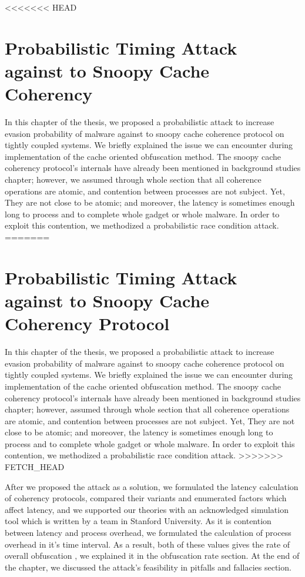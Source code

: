<<<<<<< HEAD
\chapter{Probabilistic Timing Attack against to Snoopy Cache Coherency}
In this chapter of the thesis, we proposed a probabilistic attack to increase evasion probability of malware against to snoopy cache coherence protocol on tightly coupled systems. We briefly explained the issue we can encounter during implementation of the cache oriented obfuscation method. The snoopy cache coherency protocol's internals have already been mentioned in background studies chapter; however, we assumed through whole section that all coherence operations are atomic, and contention between processes are not subject. Yet, They are not close to be atomic; and moreover, the latency is sometimes enough long to process and to complete whole gadget or whole malware. In order to exploit this contention, we methodized a probabilistic race condition attack. 
=======
\chapter{Probabilistic Timing Attack against to Snoopy Cache Coherency Protocol}
In this chapter of the thesis, we proposed a probabilistic attack to increase evasion probability of malware against to snoopy cache coherence protocol on tightly coupled systems. We briefly explained the issue we can encounter during implementation of the cache oriented obfuscation method. The snoopy cache coherency protocol's internals have already been mentioned in background studies chapter; however, assumed through whole section that all coherence operations are atomic, and contention between processes are not subject. Yet, They are not close to be atomic; and moreover, the latency is sometimes enough long to process and to complete whole gadget or whole malware. In order to exploit this contention, we methodized a probabilistic race condition attack. 
>>>>>>> FETCH_HEAD

After we proposed the attack as a solution, we formulated the latency calculation of coherency protocols, compared their variants and enumerated factors which affect latency, and we supported our theories with an acknowledged simulation tool which is written by a team in Stanford University. As it is contention between latency and process overhead, we formulated the calculation of process overhead in it's time interval. As a result, both of these values gives the rate of overall obfuscation , we explained it in the obfuscation rate section. At the end of the chapter, we discussed the attack's feasibility in pitfalls and fallacies section.

